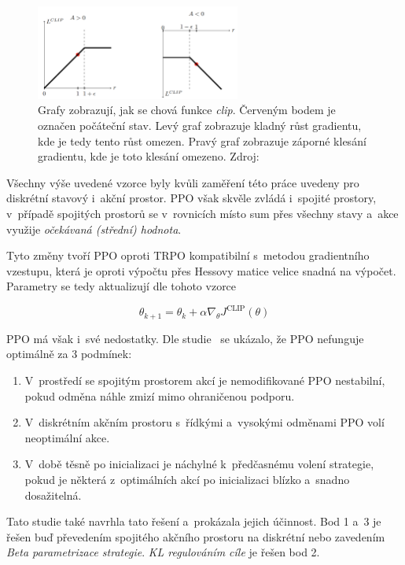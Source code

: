 \begin{figure}[H]
	\centering
	\includegraphics[width=0.6\textwidth]{obrazky-figures/clip}
	\caption{Grafy zobrazují, jak se chová funkce \emph{clip}.
  Červeným bodem je označen počáteční stav.
  Levý graf zobrazuje kladný růst gradientu, kde je tedy tento růst omezen.
  Pravý graf zobrazuje záporné klesání gradientu, kde je toto klesání omezeno.
  Zdroj:~\cite{RL_basics}}\label{fig:clip}
\end{figure}

Všechny výše uvedené vzorce byly kvůli zaměření této práce uvedeny pro diskrétní stavový i~akční prostor.
PPO však skvěle zvládá i~spojité prostory, v~případě spojitých prostorů se v~rovnicích místo sum přes všechny stavy a~akce využije \emph{očekávaná (střední) hodnota}.


Tyto změny tvoří PPO oproti TRPO kompatibilní s~metodou gradientního vzestupu, která je oproti výpočtu přes Hessovy matice velice snadná na výpočet.
Parametry se tedy aktualizují dle tohoto vzorce

\begin{equation}
  \theta_{k+1} = \theta_k + \alpha \nabla_\theta J^{\text{CLIP}}(\theta)
\end{equation}

PPO má však i~své nedostatky.
\label{PPO_weakness}
Dle studie~\cite{PPO_weakness} se ukázalo, že PPO nefunguje optimálně za 3 podmínek:
\begin{enumerate}
  \item V~prostředí se spojitým prostorem akcí je nemodifikované PPO nestabilní, pokud odměna náhle zmizí mimo ohraničenou podporu.
  \item V~diskrétním akčním prostoru s~řídkými a~vysokými odměnami PPO volí neoptimální akce.
  \item V~době těsně po inicializaci je náchylné k~předčasnému volení strategie, pokud je některá z~optimálních akcí po inicializaci blízko a~snadno dosažitelná.
\end{enumerate}

Tato studie také navrhla tato řešení a~prokázala jejich účinnost.
Bod 1 a~3 je řešen buď převedením spojitého akčního prostoru na diskrétní nebo zavedením \emph{Beta parametrizace strategie}.
\emph{KL regulováním cíle} je řešen bod 2.

